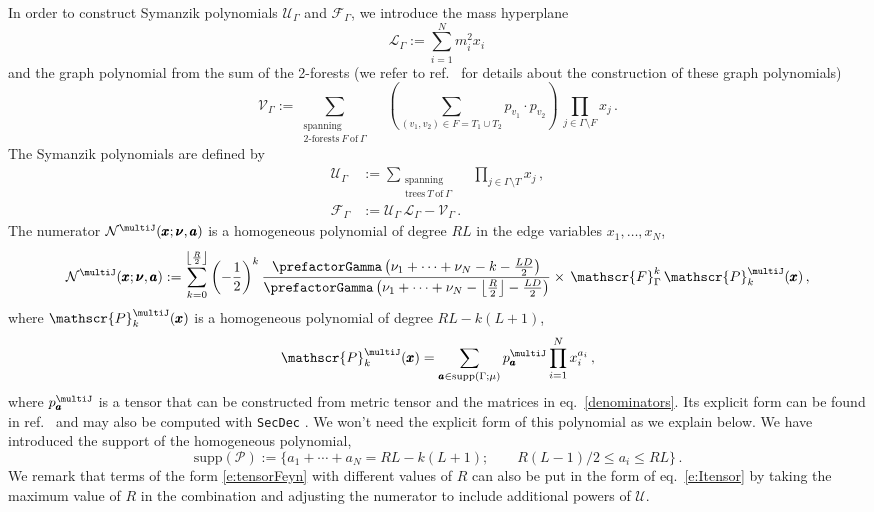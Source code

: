 \documentclass[12pt,a4paper]{article}
\theoremstyle{plain}
\theoremstyle{remark}
\newcommand{\nprops}{N}
\newcommand{\feynpar}{x}
\newcommand{\sumnus}{\nu_1+\dots+\nu_{\nprops}}
\newcommand{\cU}{\mathscr {U}}
\newcommand{\cF}{\mathscr {F}}
\newcommand{\cV}{\mathscr {V}}
\newcommand{\cL}{\mathscr {L}}
\newcommand{\undernotation}[1]{\pmb{#1}}
\begin{document}
        In order to construct  Symanzik polynomials $\cU_\Gamma$ and $\cF_\Gamma$,  we introduce the mass hyperplane
	\begin{equation}
		\label{e:Ldef}
		\cL_\Gamma:=\sum_{i=1}^\nprops m_i^2 \feynpar_i \, 
	\end{equation}
	and  the graph polynomial from the sum of the 2-forests  (we
        refer to ref.~\cite{Nakanishi:1971} for details about the
        construction of these graph polynomials)
	\begin{equation}
		\label{e:Vdef}
		\cV_\Gamma:=\sum_{\substack{\text{spanning}\\\text{2-forests}~F~\text{of}~\Gamma}}
		\quad  \left(\sum_{(v_1,v_2)\in F=T_1\cup T_2} p_{v_1}\cdot
		p_{v_2}\right)\, \prod_{j\in \Gamma\setminus F} \feynpar_j \,. 
	\end{equation}
	The Symanzik polynomials are  defined by
	\begin{align}
		\label{e:Udef}
		\cU_\Gamma&:= \sum_{\substack{\text{spanning}\\\text{trees}~T~\text{of}~\Gamma}}
		\quad
		\prod_{j\in \Gamma\setminus T} \feynpar_j\,, \\
		\label{e:Fdef}
		\cF_\Gamma&:= \cU_\Gamma \,\cL_\Gamma-\cV_\Gamma \, .
	\end{align}
	The numerator $\mathcal{N}^{\multiJ}(\undernotation{x};\undernotation{\nu},\undernotation{a})$ is a homogeneous polynomial of degree $RL$ in the edge variables $\feynpar_1,\dots,\feynpar_\nprops$,
    \begin{equation}
		\mathcal N^{\multiJ}(\undernotation{x};\undernotation{\nu},\undernotation {a}):=    \sum_{k=0}^{\left\lfloor
			R\over2\right\rfloor} \left(-\frac12\right)^k
		{ \prefactorGamma\left(\sumnus-k-{LD\over2}\right)\over  \prefactorGamma\left(\sumnus-\left\lfloor
			R\over2\right\rfloor-{LD\over2}\right)} 
		\times \,  \mathscr{F}_\Gamma^k\,
		\mathscr{P}_k^{\multiJ}(\undernotation x) \,,
	\end{equation}
%
	where $\mathscr{P}^{\multiJ}_k(\undernotation x)$ is a homogeneous polynomial
 of degree
	$RL-k(L+1)$,
	\begin{equation}\label{e:Pdef}
		\mathscr{P}^{\multiJ}_k(\undernotation
		x)=\sum_{\undernotation{a} \in \textrm{supp}(\Gamma;\mu)}
		p^{\multiJ }_{\undernotation a }\prod_{i=1}^\nprops x_i^{a_i} \, ,
	\end{equation}
where $p^{\multiJ }_{\undernotation a }$ is a tensor that can be constructed from metric tensor and the matrices in eq.~\eqref{denominators}. Its explicit form can be found in ref.~\cite{Heinrich:2008si} and may also be computed with \texttt{SecDec} \cite{Heinrich:2021dbf}. We won't need the explicit form of this polynomial as we explain below. 
    We have introduced the support of the homogeneous polynomial,
	\begin{equation}
		\textrm{supp}(\mathscr{P}):=\{
		a_1+\cdots +a_\nprops=RL-k(L+1); \qquad
		R(L-1)/2\leq a_i\leq RL\}\, .
	\end{equation}
        We remark that terms of the form  \eqref{e:tensorFeyn} with different values of $R$ can also be put in the form of eq.~\eqref{e:Itensor} by taking the maximum value of $R$ in the combination and adjusting the numerator to include additional powers of $\cU$. 
	
\end{document}
